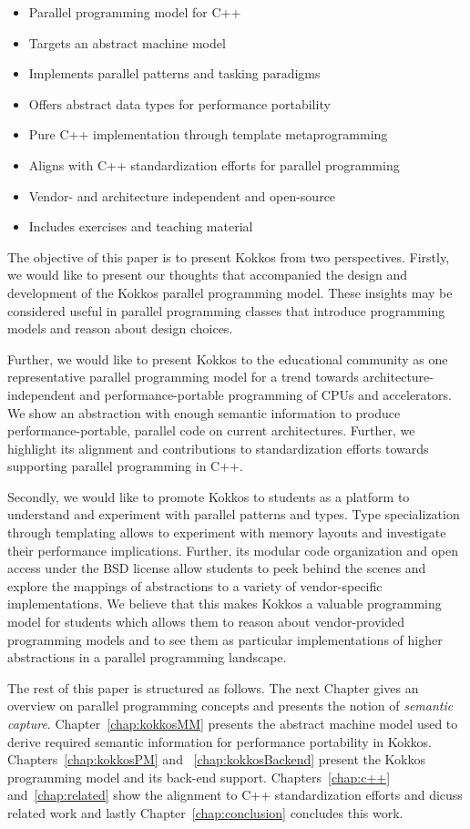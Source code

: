 \begin{itemize}
\item Parallel programming model for C++
\item Targets an abstract machine model
\item Implements parallel patterns and tasking paradigms
\item Offers abstract data types for performance portability
\item Pure C++ implementation through template metaprogramming
\item Aligns with C++ standardization efforts for parallel programming
\item Vendor- and architecture independent and open-source
\item Includes exercises and teaching material
\end{itemize}

The objective of this paper is to present Kokkos from two perspectives. Firstly, we would like to present our thoughts that accompanied the design and development of the Kokkos parallel programming model. These insights may be considered useful in parallel programming classes that introduce programming models and reason about design choices.

Further, we would like to present Kokkos to the educational community as one representative parallel programming model for a trend towards architecture-independent and performance-portable programming of CPUs and accelerators. We show an abstraction with enough semantic information to produce performance-portable, parallel code on current architectures. Further, we highlight its alignment and contributions to standardization efforts towards supporting parallel programming in C++. 

Secondly, we would like to promote Kokkos to students as a platform to understand and experiment with parallel patterns and types. Type specialization through templating allows to experiment with memory layouts and investigate their performance implications. Further, its modular code organization and open access under the BSD license allow students to peek behind the scenes and explore the mappings of abstractions to a variety of vendor-specific implementations. We believe that this makes Kokkos a valuable programming model for students which allows them to reason about vendor-provided programming models and to see them as particular implementations of higher abstractions in a parallel programming landscape.

The rest of this paper is structured as follows. The next Chapter gives an overview on parallel programming concepts and presents the notion of \emph{semantic capture}. Chapter~\ref{chap:kokkosMM} presents the abstract machine model used to derive required semantic information for performance portability in Kokkos. Chapters~\ref{chap:kokkosPM} and ~\ref{chap:kokkosBackend} present the Kokkos programming model and its back-end support. Chapters~\ref{chap:c++} and~\ref{chap:related} show the alignment to C++ standardization efforts and dicuss related work and lastly Chapter~\ref{chap:conclusion} concludes this work.
